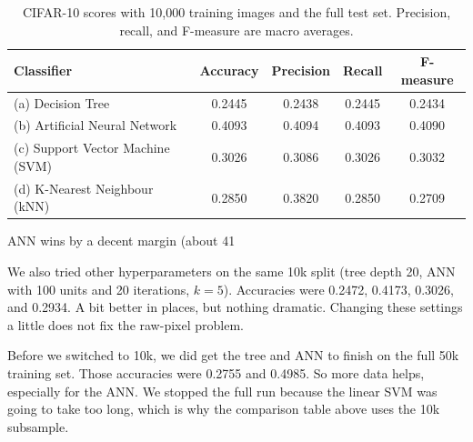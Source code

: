 \documentclass[11pt]{article}
\begin{document}
\begin{table}[h!]
\centering
\begin{tabular}{|l|c|c|c|c|}
\hline
\textbf{Classifier} & \textbf{Accuracy} & \textbf{Precision} & \textbf{Recall} & \textbf{F-measure} \tabularnewline \hline
(a) Decision Tree & 0.2445 & 0.2438 & 0.2445 & 0.2434 \tabularnewline \hline
(b) Artificial Neural Network & 0.4093 & 0.4094 & 0.4093 & 0.4090 \tabularnewline \hline
(c) Support Vector Machine (SVM) & 0.3026 & 0.3086 & 0.3026 & 0.3032 \tabularnewline \hline
(d) K-Nearest Neighbour (kNN) & 0.2850 & 0.3820 & 0.2850 & 0.2709 \tabularnewline \hline
\end{tabular}
\caption{CIFAR-10 scores with 10,000 training images and the full test set. Precision, recall, and F-measure are macro averages.}
\end{table}

ANN wins by a decent margin (about 41%

We also tried other hyperparameters on the same 10k split (tree depth 20, ANN with 100 units and 20 iterations, $k=5$). Accuracies were 0.2472, 0.4173, 0.3026, and 0.2934. A bit better in places, but nothing dramatic. Changing these settings a little does not fix the raw-pixel problem.

Before we switched to 10k, we did get the tree and ANN to finish on the full 50k training set. Those accuracies were 0.2755 and 0.4985. So more data helps, especially for the ANN. We stopped the full run because the linear SVM was going to take too long, which is why the comparison table above uses the 10k subsample.
\end{document}
